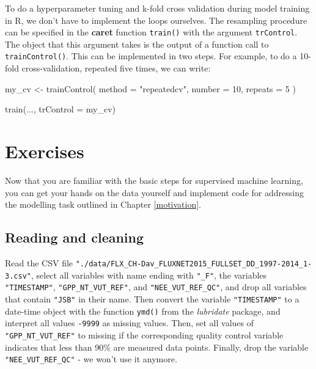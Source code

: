 \documentclass[
]{book}
\newenvironment{Shaded}{\begin{snugshade}}{\end{snugshade}}
\newcommand{\AttributeTok}[1]{\textcolor[rgb]{0.77,0.63,0.00}{#1}}
\newcommand{\DecValTok}[1]{\textcolor[rgb]{0.00,0.00,0.81}{#1}}
\newcommand{\FunctionTok}[1]{\textcolor[rgb]{0.00,0.00,0.00}{#1}}
\newcommand{\NormalTok}[1]{#1}
\newcommand{\OtherTok}[1]{\textcolor[rgb]{0.56,0.35,0.01}{#1}}
\newcommand{\StringTok}[1]{\textcolor[rgb]{0.31,0.60,0.02}{#1}}
\begin{document}
To do a hyperparameter tuning and k-fold cross validation during model training in R, we don't have to implement the loops ourselves. The resampling procedure can be specified in the \textbf{caret} function \texttt{train()} with the argument \texttt{trControl}. The object that this argument takes is the output of a function call to \texttt{trainControl()}. This can be implemented in two steps. For example, to do a 10-fold cross-validation, repeated five times, we can write:

\begin{Shaded}
\begin{Highlighting}[]
\NormalTok{my\_cv }\OtherTok{\textless{}{-}} \FunctionTok{trainControl}\NormalTok{(}
  \AttributeTok{method =} \StringTok{"repeatedcv"}\NormalTok{,}
  \AttributeTok{number =} \DecValTok{10}\NormalTok{,}
  \AttributeTok{repeats =} \DecValTok{5}
\NormalTok{)}

\FunctionTok{train}\NormalTok{(..., }\AttributeTok{trControl =}\NormalTok{ my\_cv)}
\end{Highlighting}
\end{Shaded}

\hypertarget{exercises}{%
\chapter{Exercises}\label{exercises}}

Now that you are familiar with the basic steps for supervised machine learning, you can get your hands on the data yourself and implement code for addressing the modelling task outlined in Chapter \ref{motivation}.

\hypertarget{reading-and-cleaning}{%
\section{Reading and cleaning}\label{reading-and-cleaning}}

Read the CSV file \texttt{"./data/FLX\_CH-Dav\_FLUXNET2015\_FULLSET\_DD\_1997-2014\_1-3.csv"}, select all variables with name ending with \texttt{"\_F"}, the variables \texttt{"TIMESTAMP"}, \texttt{"GPP\_NT\_VUT\_REF"}, and \texttt{"NEE\_VUT\_REF\_QC"}, and drop all variables that contain \texttt{"JSB"} in their name. Then convert the variable \texttt{"TIMESTAMP"} to a date-time object with the function \texttt{ymd()} from the \emph{lubridate} package, and interpret all values \texttt{-9999} as missing values. Then, set all values of \texttt{"GPP\_NT\_VUT\_REF"} to missing if the corresponding quality control variable indicates that less than 90\% are measured data points. Finally, drop the variable \texttt{"NEE\_VUT\_REF\_QC"} - we won't use it anymore.
\end{document}
